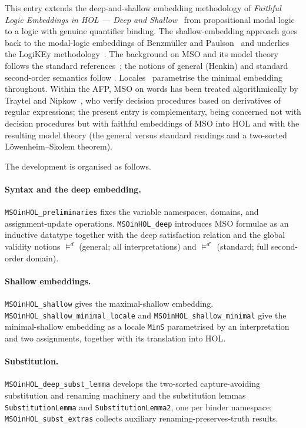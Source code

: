 \documentclass[11pt,a4paper]{article}
\newcommand{\bk}{\_\penalty10\hspace{0pt}}
\begin{document}
This entry extends the deep-and-shallow embedding methodology of
\emph{Faithful Logic Embeddings in HOL --- Deep and Shallow}~\cite{C98} from
propositional modal logic to a logic with genuine quantifier binding. The shallow-embedding approach goes
back to the modal-logic embeddings of Benzm\"uller and Paulson~\cite{J21,J23}
and underlies the LogiKEy methodology~\cite{J48}. The background on MSO and its
model theory follows the standard references~\cite{Thomas1997,Courcelle2012,Buchi1960};
the notions of general (Henkin) and standard second-order semantics follow
\cite{henkin1950,Shapiro1991,Vaananen2011,Manzano1996}. Locales~\cite{ballarin2014}
parametrise the minimal embedding throughout. Within the AFP, MSO on words has
been treated algorithmically by Traytel and Nipkow~\cite{MSO_Regex_Equivalence-AFP},
who verify decision procedures based on derivatives of regular expressions; the
present entry is complementary, being concerned not with decision procedures but
with faithful embeddings of MSO into HOL and with the resulting model theory
(the general versus standard readings and a two-sorted L\"owenheim--Skolem
theorem).

The development is organised as follows.

\paragraph{Syntax and the deep embedding.}
\texttt{MSOinHOL\_preliminaries} fixes the variable namespaces, domains, and
assignment-update operations. \texttt{MSOinHOL\_deep} introduces MSO formulae as
an inductive datatype together with the deep satisfaction relation and the
global validity notions $\models^{d}$ (general; all interpretations) and
$\models^{d'}$ (standard; full second-order domain).

\paragraph{Shallow embeddings.}
\texttt{MSOinHOL\_shallow} gives the maximal-shallow embedding.
\texttt{MSOinHOL\bk shallow\bk minimal\bk locale} and
\texttt{MSOinHOL\bk shallow\bk minimal} give the minimal-shallow embedding as a
locale \texttt{MinS} parametrised by an interpretation and two assignments,
together with its translation into HOL.

\paragraph{Substitution.}
\texttt{MSOinHOL\bk deep\bk subst\bk lemma} develops the two-sorted
capture-avoiding substitution and renaming machinery and the substitution
lemmas \texttt{SubstitutionLemma} and \texttt{SubstitutionLemma2}, one per
binder namespace; \texttt{MSOinHOL\bk subst\bk extras} collects auxiliary
renaming-preserves-truth results.
\end{document}
